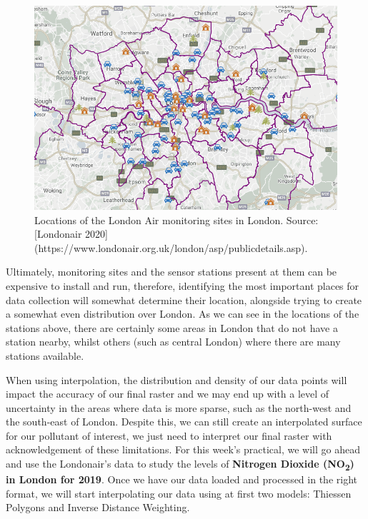 \documentclass[
]{book}
\begin{document}
\begin{figure}

{\centering \includegraphics[width=550pt]{images/w09/london_air} 

}

\caption{Locations of the London Air monitoring sites in London. Source: [Londonair 2020](https://www.londonair.org.uk/london/asp/publicdetails.asp).}\label{fig:09-monitoring-in-london}
\end{figure}

Ultimately, monitoring sites and the sensor stations present at them can be expensive to install and run, therefore, identifying the most important places for data collection will somewhat determine their location, alongside trying to create a somewhat even distribution over London. As we can see in the locations of the stations above, there are certainly some areas in London that do not have a station nearby, whilst others (such as central London) where there are many stations available.

When using interpolation, the distribution and density of our data points will impact the accuracy of our final raster and we may end up with a level of uncertainty in the areas where data is more sparse, such as the north-west and the south-east of London. Despite this, we can still create an interpolated surface for our pollutant of interest, we just need to interpret our final raster with acknowledgement of these limitations. For this week's practical, we will go ahead and use the Londonair's data to study the levels of \textbf{Nitrogen Dioxide (NO\textsubscript{2}) in London for 2019}. Once we have our data loaded and processed in the right format, we will start interpolating our data using at first two models: Thiessen Polygons and Inverse Distance Weighting.
\end{document}
